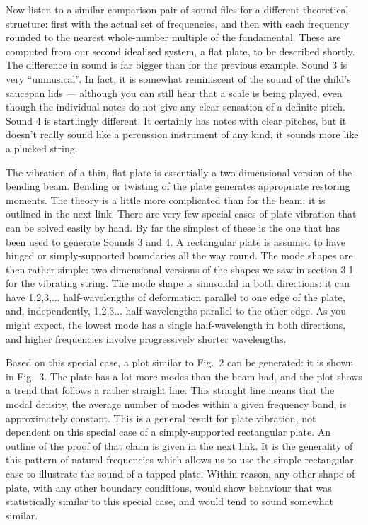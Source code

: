   Now listen to a similar comparison pair of sound files for a different 
  theoretical structure: first with the actual set of frequencies, and then 
  with each frequency rounded to the nearest whole-number multiple of the 
  fundamental. These are computed from our second idealised system, a flat 
  plate, to be described shortly. The difference in sound is far bigger than 
  for the previous example. Sound 3 is very ``unmusical''. In fact, it is 
  somewhat reminiscent of the sound of the child's saucepan lids --- although 
  you can still hear that a scale is being played, even though the individual 
  notes do not give any clear sensation of a definite pitch. Sound 4 is 
  startlingly different. It certainly has notes with clear pitches, but it 
  doesn't really sound like a percussion instrument of any kind, it sounds more 
  like a plucked string. 

  The vibration of a thin, flat plate is essentially a two-dimensional version 
  of the bending beam. Bending or twisting of the plate generates appropriate 
  restoring moments. The theory is a little more complicated than for the beam: 
  it is outlined in the next link. There are very few special cases of plate 
  vibration that can be solved easily by hand. By far the simplest of these is 
  the one that has been used to generate Sounds 3 and 4. A rectangular plate is 
  assumed to have hinged or simply-supported boundaries all the way round. The 
  mode shapes are then rather simple: two dimensional versions of the shapes we 
  saw in section 3.1 for the vibrating string. The mode shape is sinusoidal in 
  both directions: it can have 1,2,3,... half-wavelengths of deformation 
  parallel to one edge of the plate, and, independently, 1,2,3... 
  half-wavelengths parallel to the other edge. As you might expect, the lowest 
  mode has a single half-wavelength in both directions, and higher frequencies 
  involve progressively shorter wavelengths. 

  Based on this special case, a plot similar to Fig.\ 2 can be generated: it is 
  shown in Fig.\ 3. The plate has a lot more modes than the beam had, and the 
  plot shows a trend that follows a rather straight line. This straight line 
  means that the modal density, the average number of modes within a given 
  frequency band, is approximately constant. This is a general result for plate 
  vibration, not dependent on this special case of a simply-supported 
  rectangular plate. An outline of the proof of that claim is given in the next 
  link. It is the generality of this pattern of natural frequencies which 
  allows us to use the simple rectangular case to illustrate the sound of a 
  tapped plate. Within reason, any other shape of plate, with any other 
  boundary conditions, would show behaviour that was statistically similar to 
  this special case, and would tend to sound somewhat similar. 

